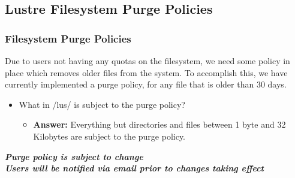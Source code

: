 \subsection{Lustre Filesystem Purge Policies}
\begin{frame}
\frametitle{{\lustre} Filesystem Purge Policies}
Due to users not having any quotas on the {\lustre} filesystem, we need some policy in place which removes older files from the system.  To accomplish this, we have currently implemented a purge policy, for any file that is older than 30 days.
\begin{itemize}
 \item What in \ctilde/lus/ is subject to the purge policy?
   \begin{itemize}
   \item \textbf{Answer:} Everything but directories and files between 1 byte and 32 Kilobytes are subject to the purge policy.
   \end{itemize}
\end{itemize}
\btVFill
\begin{center}
\footnotesize \textbf{\emph{Purge policy is subject to change~\\Users will be notified via email prior to changes taking effect}}
\end{center}
\end{frame}
